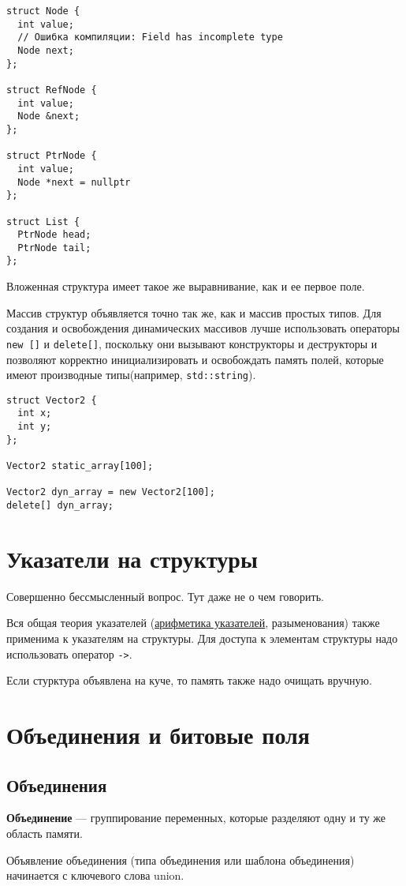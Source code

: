 \documentclass[14pt, a4paper]{extarticle}
\begin{document}
\begin{verbatim}
struct Node {
  int value;
  // Ошибка компиляции: Field has incomplete type
  Node next;
};

struct RefNode {
  int value;
  Node &next;
};

struct PtrNode {
  int value;
  Node *next = nullptr
};

struct List {
  PtrNode head;
  PtrNode tail;
};
\end{verbatim}

Вложенная структура имеет такое же выравнивание, как и ее первое поле.

Массив структур объявляется точно так же, как и массив простых типов.
Для создания и освобождения динамических массивов лучше использовать
операторы \verb|new []| и \verb|delete[]|, поскольку они вызывают
конструкторы и деструкторы и позволяют корректно инициализировать и
освобождать память полей, которые имеют производные типы(например,
\verb|std::string|).
\begin{verbatim}
struct Vector2 {
  int x;
  int y;
};

Vector2 static_array[100];

Vector2 dyn_array = new Vector2[100];
delete[] dyn_array;
\end{verbatim}

\section{Указатели на структуры}
Совершенно бессмысленный вопрос. Тут даже не о чем говорить.

Вся общая теория указателей (\hyperref[sec:ptr_arithm]{арифметика указателей}, разыменования) также
применима к указателям на структуры. Для доступа к элементам структуры надо использовать
оператор \verb|->|.

Если стурктура объявлена на куче, то память также надо очищать вручную.

\section{Объединения и битовые поля}
\subsection*{Объединения}
\textbf{Объединение} --- группирование переменных, которые разделяют одну и ту же область памяти.

Объявление объединения (типа объединения или шаблона объединения) начинается с ключевого слова union.
\end{document}
